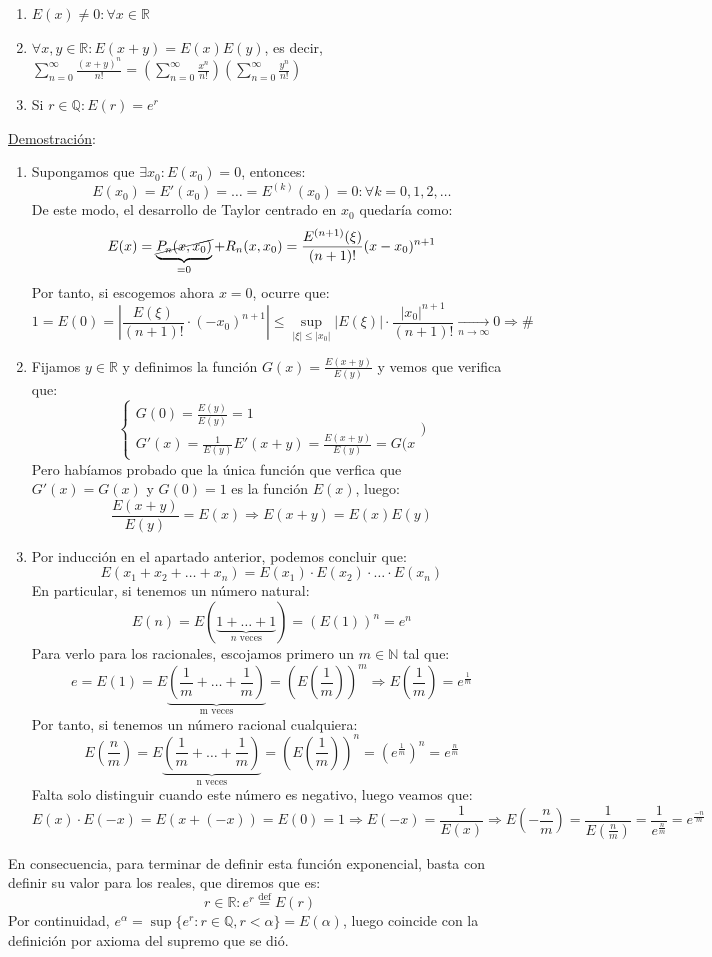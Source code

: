 \documentclass[10pt,a4paper,openright]{book}
\begin{document}
\begin{enumerate}
\item $E(x) \neq 0 : \forall x \in \mathbb{R}$
\item $\forall x, y \in \mathbb{R} : E(x+y) = E(x) E(y)$, es decir,
$\sum_{n=0}^{\infty} \frac{(x+y)^n}{n!} = \left( \sum_{n=0}^{\infty} \frac{x^n}{n!}\right) \left( \sum_{n=0}^{\infty} \frac{y^n}{n!} \right)$
\item Si $r \in \mathbb{Q} : E(r) = e^r$
\end{enumerate}
\underline{Demostración}:
\begin{enumerate}
\item Supongamos que $\exists x_0 : E(x_0) = 0$, entonces:
$$ E(x_0) = E'(x_0) = \ldots = E^{(k)}(x_0) = 0 : \forall k = 0, 1, 2, \ldots$$
De este modo, el desarrollo de Taylor centrado en $x_0$ quedaría como:
$$E(x) = \underbrace{\cancel{P_n(x, x_0)}}_{=0} + R_n (x, x_0) = \frac{E^{(n+1)} (\xi)}{(n+1)!} (x - x_0)^{n+1}$$
Por tanto, si escogemos ahora $x =0$, ocurre que:
$$1  = E(0) = \left| \frac{E(\xi)}{(n+1)!} \cdot (-x_0)^{n+1} \right| \leq \underset{|\xi| \leq |x_0|}{\sup} |E(\xi)| \cdot \frac{|x_0|^{n+1}}{(n+1)!}\underset{n \to \infty}{\longrightarrow} 0 \Rightarrow \#$$

\item Fijamos $y \in \mathbb{R}$ y definimos la función $G(x) = \frac{E(x+y)}{E(y)}$ y vemos que verifica que:
$$\begin{cases} G(0)= \frac{E(y)}{E(y)} = 1 \\ G'(x) = \frac{1}{E(y)} E'(x+y) = \frac{E(x+y)}{E(y)} = G(x \end{cases})$$
Pero habíamos probado que la única función que verfica que $G'(x) = G(x)$ y $G(0) = 1$ es la función $E(x)$, luego:
$$\frac{E(x+y)}{E(y)} = E(x) \Rightarrow E(x+y) = E(x)E(y)$$

\item Por inducción en el apartado anterior, podemos concluir que:
$$E(x_1 + x_2 + \ldots + x_n) = E(x_1) \cdot E(x_2) \cdot \ldots \cdot E(x_n)$$
En particular, si tenemos un número natural:
$$E(n) = E(\underbrace{ 1 + \ldots + 1}_{n \mbox{ veces}}) = (E(1))^n = e^n$$
Para verlo para los racionales, escojamos primero un $m \in \mathbb{N}$ tal que:
$$e = E(1) = E\underbrace{\left(\frac{1}{m} + \ldots + \frac{1}{m}\right)}_{\mbox{m veces}} = \left(E(\frac{1}{m})\right)^m\Rightarrow E(\frac{1}{m}) = e^\frac{1}{m}$$
Por tanto, si tenemos un número racional cualquiera:
$$E\left(\frac{n}{m}\right) = E\underbrace{\left(\frac{1}{m} + \ldots + \frac{1}{m}\right)}_{\mbox{n veces}} = \left(E(\frac{1}{m})\right)^n = (e^\frac{1}{m})^n = e^\frac{n}{m}$$
Falta solo distinguir cuando este número es negativo, luego veamos que:
$$E(x) \cdot E(-x) = E(x + (-x)) = E(0) = 1 \Rightarrow E(-x) = \frac{1}{E(x)} \Rightarrow E\left(-\frac{n}{m}\right) = \frac{1}{E(\frac{n}{m})} = \frac{1}{e^\frac{n}{m}} = e^{\frac{-n}{m}}$$
\end{enumerate}
En consecuencia, para terminar de definir esta función exponencial, basta con definir su valor para los reales, que diremos que es:
$$r \in \mathbb{R} : e^r \overset{\mbox{def}}{=} E(r)$$
Por continuidad, $e^\alpha = \sup \{e^r : r \in \mathbb{Q}, r < \alpha\} = E(\alpha)$, luego coincide con la definición por axioma del supremo que se dió.
\end{document}
